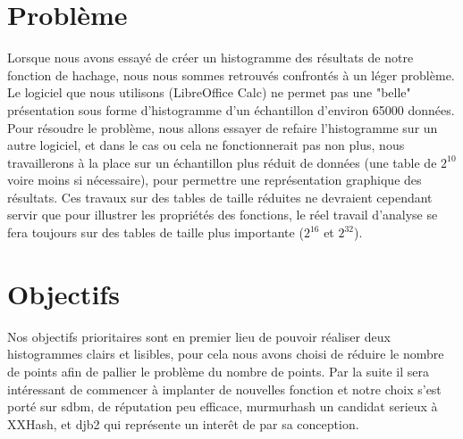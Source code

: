 \documentclass[final,twoside,article,10pt]{scrartcl}
\begin{document}
\section{Problème}
    Lorsque nous avons essayé de créer un histogramme des résultats de notre fonction de hachage, nous nous sommes retrouvés confrontés à un léger problème.
    Le logiciel que nous utilisons (LibreOffice Calc) ne permet pas une "belle" présentation sous forme d'histogramme d'un échantillon d'environ 65000 données.
    Pour résoudre le problème, nous allons essayer de refaire l'histogramme sur un autre logiciel, et dans le cas ou cela ne fonctionnerait pas non plus, nous travaillerons à la place sur un échantillon plus réduit de données (une table de $2^{10}$ voire moins si nécessaire), pour permettre une représentation graphique des résultats.
    Ces travaux sur des tables de taille réduites ne devraient cependant servir que pour illustrer les propriétés des fonctions, le réel travail d'analyse se fera toujours sur des tables de taille plus importante ($2^{16}$ et $2^{32}$).
    \par 

\section*{Objectifs}

Nos objectifs prioritaires sont en premier lieu de pouvoir réaliser deux histogrammes clairs et lisibles, pour cela nous avons choisi de réduire le nombre de points afin de pallier le problème du nombre de points. Par la suite il sera intéressant de commencer à implanter de nouvelles fonction et notre choix s'est porté sur sdbm, de réputation peu efficace, murmurhash un candidat serieux à XXHash, et djb2 qui représente un interêt de par sa conception.


\end{document}
